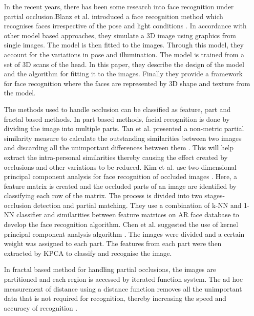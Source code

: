 \documentclass[conference]{IEEEtran}
\begin{document}
In the recent years, there has been some research into face recognition under partial occlusion.Blanz et al. introduced a face recognition method which recognises faces irrespective of the pose and light conditions \cite{blanz2003face}. In accordance with other model based approaches, they simulate a 3D image using graphics from single images. The model is then fitted to the images. Through this model, they account for the variations in pose and illumination. The model is trained from a set of 3D scans of the head. In this paper, they describe the design of the model and the algorithm for fitting it to the images. Finally they provide a framework for face recognition where the faces are represented by 3D shape and texture from the model. 

The methods used to handle occlusion can be classified as feature, part and fractal based methods. In part based methods, facial recognition is done by dividing the image into multiple parts. Tan et al. presented a non-metric partial similarity measure to calculate the outstanding similarities between two images and discarding all the unimportant differences between them \cite{tan2006learning}. This will help  extract the intra-personal similarities thereby causing the effect created by occlusions and other variations to be reduced. Kim et al. use two-dimensional principal component analysis for face recognition of occluded images \cite{kim2007occlusion}. Here, a feature matrix is created and the occluded parts of an image are identified by classifying each row of the matrix. The process is divided into two stages- occlusion detection and partial matching. They use a combination of k-NN and 1-NN classifier and similarities between feature matrices on AR face database to develop the face recognition algorithm. Chen et al. suggested the use of kernel principal component analysis algorithm \cite{chen2016recognition}. The images were divided and a certain weight was assigned to each part. The features from each part were then extracted by KPCA to classify and recognise the image.

In fractal based method for handling partial occlusions, the images are partitioned and each region is accessed by iterated function system. The ad hoc measurement of distance using a distance function removes all the unimportant data that is not required for recognition, thereby increasing the speed and accuracy of recognition \cite{abate20072d}.
\end{document}
